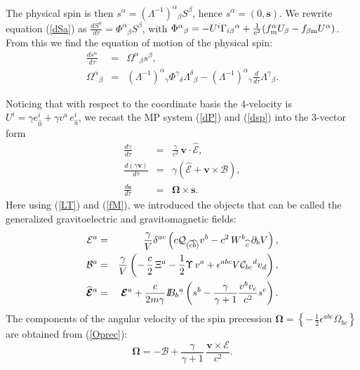 \documentclass[preprint,showpacs,preprintnumbers,eqsecnum,amsmath,amssymb]{revtex4-1}
\newcommand{\dB}{I \! \! B}
\begin{document}
The physical spin is then $s^\alpha = (\Lambda^{-1})^\alpha{}_\beta S^\beta$, hence
$s^\alpha = (0, \bm{s})$. We rewrite equation (\ref{dSa}) as ${\frac {dS^\alpha}
{d\tau}} = \Phi^\alpha{}_\beta S^\beta$, with $\Phi^\alpha{}_\beta = - U^i
\Gamma_{i\beta}{}^\alpha + {\frac {1}{c^2}}(f_{\rm m}^\alpha U_\beta - f_{\beta{\rm m}}
U^\alpha)$. From this we find the equation of motion of the physical spin:
 \begin{eqnarray}
{\frac {ds^\alpha}{d\tau}} &=& \Omega^\alpha{}_\beta s^\beta,\label{dsp}\\
\Omega^\alpha{}_\beta &=& (\Lambda^{-1})^\alpha{}_\gamma\Phi^\gamma{}_\delta
\Lambda^\delta{}_\beta - (\Lambda^{-1})^\alpha{}_\gamma{\frac d {d\tau}}
\Lambda^\gamma{}_\beta.\label{Oprec}
\end{eqnarray}

Noticing that with respect to the coordinate basis the 4-velocity is
$U^i = \gamma e^i_{\widehat 0}+ \gamma v^a\,e^i_{\widehat a}$,
we recast the MP system (\ref{dP}) and (\ref{dsp}) into the 3-vector form
\begin{eqnarray}
{\frac {d\gamma}{d\tau}} &=& {\frac \gamma {c^2}}\,{\bm v}\cdot
\widehat{\bm{\mathcal{E}}},\label{dgamma}\\
{\frac {d(\gamma\bm{v})}{d\tau}} &=& \gamma\left(\widehat{\bm{\mathcal{E}}} 
+ \bm{v}\times\bm{\mathcal{B}}\right),\label{force}\\
{\frac {d{\bm s}}{d\tau}} &=& \bm\Omega\times\bm s.\label{dsMP}
\end{eqnarray}
Here using (\ref{LT}) and (\ref{fM}), we introduced the objects that can be 
called the generalized gravitoelectric and gravitomagnetic fields:
\begin{eqnarray}\label{ge}
{\mathcal E}^a &=& {\frac {\gamma}V}\delta^{ac}\left(c{\cal Q}_{(\widehat{c}\widehat{b})}
v^b - c^2\,W^b{}_{\widehat{c}}\,\partial_bV\right),\\ \label{gm}
{\mathcal B}^a &=& {\frac {\gamma}V}\left(-\,{\frac c2}\,{\Xi}^a -
{\frac 12}\Upsilon\,v^a + \epsilon^{abc}V{\cal C}_{bc}{}^dv_d\right),\\
\widehat{\bm{\mathcal{E}}}{}^a &=& \bm{\mathcal{E}}{}^a + {\frac {c}{2m\gamma}}
\dB_b{}^a\left(s^b - {\frac {\gamma}{\gamma + 1}}
{\frac {v^bv_c}{c^2}}s^c\right).\label{fMa}
\end{eqnarray}
The components of the angular velocity of the spin precession ${\bm\Omega}
= \left\{-\,{\frac 12}\epsilon^{abc}\Omega_{bc}\right\}$ are obtained from
(\ref{Oprec}):
\begin{equation}
\bm{\Omega} = -\bm{\mathcal{B}} + {\frac {\gamma}{\gamma +
1}}\,{\frac {\bm{v} \times\bm{\mathcal{E}}} {c^2}}.\label{omgem}
\end{equation}
\end{document}
